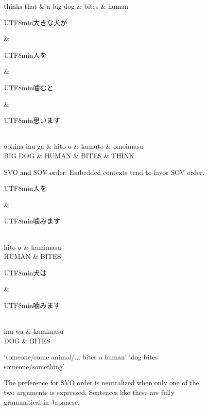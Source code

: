 \documentclass[11pt,a4paper]{article}
\newcommand{\japanese}[1]{\begin{CJK}{UTF8}{min}#1\end{CJK}}
\begin{document}
\begin{figure}[ht]
\begin{dependency}[theme = simple]
   \begin{deptext}[column sep=1em]
       thinks that \& a big dog \& bites \& human  \\
   \end{deptext}
\end{dependency}
\begin{dependency}[theme = simple]
   \begin{deptext}[column sep=1em]
   \japanese{大きな犬が} \& \japanese{人を} \& \japanese{噛むと} \& \japanese{思います}\\ 
   ookina inu-ga \& hito-o \& kamuto \& omoimasu \\
         BIG DOG \& HUMAN \& BITES \& THINK \\
   \end{deptext}
\end{dependency}
        \caption{SVO and SOV order: Embedded contexts tend to favor SOV order.}
        \label{fig:sent-dep-embedded}
\end{figure}




\begin{figure}
\begin{dependency}[theme = simple]
   \begin{deptext}[column sep=1em]
   \japanese{人を} \& \japanese{噛みます}\\ 
   hito-o \& kamimasu \\
   HUMAN \& BITES  \\
   \end{deptext}
\end{dependency}
\begin{dependency}[theme = simple]
   \begin{deptext}[column sep=1em]
   \japanese{犬は} \& \japanese{噛みます}\\ 
   inu-wa \& kamimasu \\
          DOG \& BITES  \\
   \end{deptext}
\end{dependency}
`someone/some animal/... bites a human' `dog bites someone/something'
    \caption{The preference for SVO order is neutralized when only one of the two arguments is expressed. Sentences like these are fully grammatical in Japanese.}
    \label{fig:sent-dep-1arg}
\end{figure}
\end{document}
